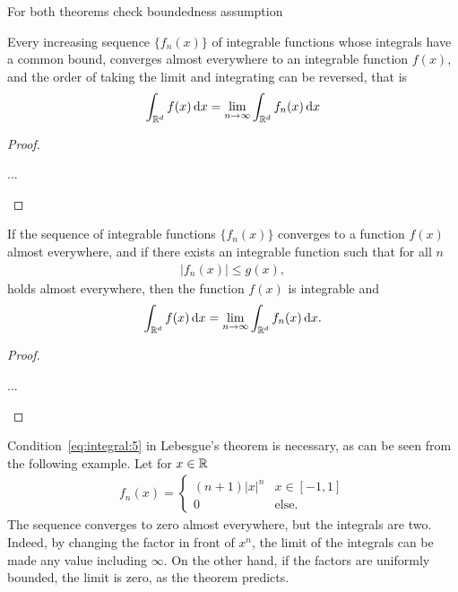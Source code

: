 \begin{todo}
  For both theorems check boundedness assumption
\end{todo}

\begin{theorem}
  Every increasing sequence $\{f_n(x)\}$ of integrable functions whose
  integrals have a common bound, converges almost everywhere to an
  integrable function $f(x)$, and the order of taking the limit and
  integrating can be reversed, that is
  \begin{gather}
    \int_{\mathbb R^d} f(x)\,\mathrm{d} x
    = \lim_{n\to\infty} \int_{\mathbb R^d} f_n(x)\,\mathrm{d} x
  \end{gather}
\end{theorem}

\begin{proof}
  \begin{todo}
    ...
  \end{todo}
\end{proof}

\begin{theorem}[Lebesgue]
  If the sequence of integrable functions $\{f_n(x)\}$ converges
  to a function $f(x)$ almost everywhere, and if there exists an
  integrable function such that for all $n$
  \begin{gather}
    \label{eq:integral:5}
    \bigl|f_n(x)\bigr| \le g(x),
  \end{gather}
  holds almost everywhere, then the function $f(x)$ is integrable and
  \begin{gather*}
    \int_{\mathbb R^d} f(x)\,\mathrm{d} x = \lim_{n\to\infty} \int_{\mathbb R^d} f_n(x)\,\mathrm{d} x.
  \end{gather*}
\end{theorem}

\begin{proof}
  \begin{todo}
    ...
  \end{todo}
\end{proof}

\begin{example}
  Condition~\eqref{eq:integral:5} in Lebesgue's theorem is necessary,
  as can be seen from the following example. Let for $x\in \mathbb R$
  \begin{gather*}
    f_n(x) =
    \begin{cases}
      (n+1) |x|^n & x\in [-1,1] \\
      0 & \text{else}.
    \end{cases}
  \end{gather*}
  The sequence converges to zero almost everywhere, but the integrals
  are two. Indeed, by changing the factor in front of $x^n$, the limit
  of the integrals can be made any value including $\infty$. On the
  other hand, if the factors are uniformly bounded, the limit is zero,
  as the theorem predicts.
\end{example}


